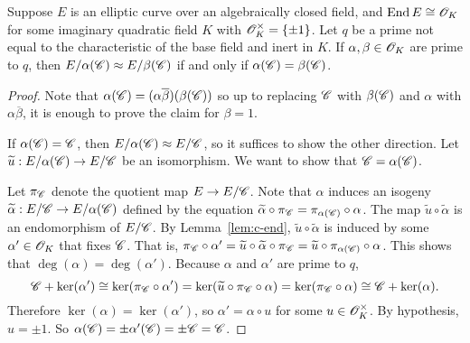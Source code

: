 \documentclass{amsart}
\begin{document}
\begin{lemma}\label{lem:c-subgps-distinct-quotients}
  Suppose $E$ is an elliptic curve over an algebraically closed field, and $\operatorname{End} E \cong \mathscr{O}_K$ for some imaginary quadratic field $K$ with $\mathscr{O}_K^\times = \{\pm 1\}$. Let $q$ be a prime not equal to the characteristic of the base field and inert in $K$. If $\alpha,\beta \in \mathscr{O}_K$ are prime to $q$, then $E/\alpha(\mathscr{C}) \approx E/\beta(\mathscr{C})$ if and only if $\alpha(\mathscr{C}) = \beta(\mathscr{C})$.
\end{lemma}
\begin{proof}
  Note that $\alpha(\mathscr{C}) = (\alpha\overline{\beta})(\beta(\mathscr{C}))$ so up to replacing $\mathscr{C}$ with $\beta(\mathscr{C})$ and $\alpha$ with $\alpha\overline{\beta}$, it is enough to prove the claim for $\beta = 1$.

  If $\alpha(\mathscr{C}) = \mathscr{C}$, then $E/\alpha(\mathscr{C}) \approx E/\mathscr{C}$, so it suffices to show the other direction. Let $\widetilde{u}: E/\alpha(\mathscr{C}) \to E/\mathscr{C}$ be an isomorphism. We want to show that $\mathscr{C} = \alpha(\mathscr{C})$.

  Let $\pi_{\mathscr{C}}$ denote the quotient map $E \to E/\mathscr{C}$. Note that $\alpha$ induces an isogeny $\widetilde{\alpha}: E/\mathscr{C} \to E/\alpha(\mathscr{C})$ defined by the equation $\widetilde{\alpha}\circ\pi_{\mathscr{C}} = \pi_{\alpha(\mathscr{C})} \circ \alpha$. The map $\tilde{u}\circ\tilde{\alpha}$ is an endomorphism of $E/\mathscr{C}$. By Lemma~\ref{lem:c-end}, $\tilde{u}\circ\tilde{\alpha}$ is induced by some $\alpha' \in \mathscr{O}_K$ that fixes $\mathscr{C}$. That is, $\pi_{\mathscr{C}}\circ\alpha' = \widetilde{u}\circ\widetilde{\alpha}\circ\pi_{\mathscr{C}} = \widetilde{u}\circ\pi_{\alpha(\mathscr{C})}\circ\alpha$. This shows that $\deg(\alpha) = \deg(\alpha')$. Because $\alpha$ and $\alpha'$ are prime to $q$,
  \[
    \mathscr{C} + \ker(\alpha')
    \cong
    \ker(\pi_{\mathscr{C}} \circ \alpha')
    =
    \ker(\widetilde{u}\circ\pi_{\mathscr{C}}\circ\alpha)
    =
    \ker(\pi_{\mathscr{C}}\circ\alpha)
    \cong
    \mathscr{C} + \ker(\alpha).
  \]
  Therefore $\ker(\alpha) = \ker(\alpha')$, so $\alpha' = \alpha\circ u$ for some $u \in \mathscr{O}_K^\times$. By hypothesis, $u = \pm 1$. So $\alpha(\mathscr{C}) = \pm\alpha'(\mathscr{C}) = \pm\mathscr{C} = \mathscr{C}$.

\end{proof}
\end{document}
